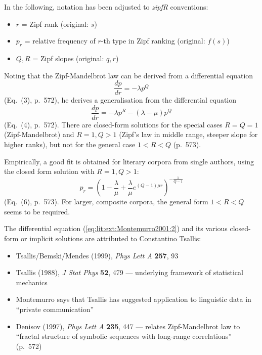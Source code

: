 \documentclass[a4paper]{article}
\begin{document}
In the following, notation has been adjusted to \emph{zipfR} conventions:
\begin{itemize}
\item $r$ = Zipf rank (original: $s$)
\item $p_r$ = relative frequency of $r$-th type in Zipf ranking (original: $f(s)$)
\item $Q, R$ = Zipf slopes (original: $q, r$) 
\end{itemize}

Noting that the Zipf-Mandelbrot law can be derived from a differential equation
\begin{equation}
  \label{eq:lit:ext:Montemurro2001:1}
  \frac{dp}{dr} = -\lambda p^Q
\end{equation}
(Eq.~(3), p.~572), he derives a generalisation from the differential equation
\begin{equation}
  \label{eq:lit:ext:Montemurro2001:2}
  \frac{dp}{dr} = -\lambda p^R - (\lambda - \mu) p^Q
\end{equation}
(Eq.~(4), p.~572).  There are closed-form solutions for the special cases $R = Q = 1$ (Zipf-Mandelbrot) and $R = 1, Q > 1$ (Zipf's law in middle range, steeper slope for higher ranks), but not for the general case $1 < R < Q$ (p.~573).  

Empirically, a good fit is obtained for literary corpora from single authors, using the closed form solution with $R = 1, Q > 1$:
\begin{equation}
  \label{eq:lit:ext:Montemurro2001:3}
  p_r = \left( 1 - \frac{\lambda}{\mu} + \frac{\lambda}{\mu} e^{(Q-1) \mu r} \right)^{-\frac1{Q-1}}
\end{equation}
(Eq.~(6), p.~573).  For larger, composite corpora, the general form $1 < R < Q$ seems to be required.

The differential equation (\ref{eq:lit:ext:Montemurro2001:2}) and its various closed-form or implicit solutions are attributed to Constantino Tsallis:
\begin{itemize}
\item Tsallis/Bemski/Mendes (1999), \emph{Phys Lett A} \textbf{257}, 93
\item Tsallis (1988), \emph{J Stat Phys} \textbf{52}, 479 --- underlying framework of statistical mechanics
\item Montemurro says that Tsallis has suggested application to linguistic data in ``private communication''
\item Denisov (1997), \emph{Phys Lett A} \textbf{235}, 447 --- relates Zipf-Mandelbrot law to ``fractal structure of symbolic sequences with long-range correlations'' (p.~572)
\end{itemize}
\end{document}
